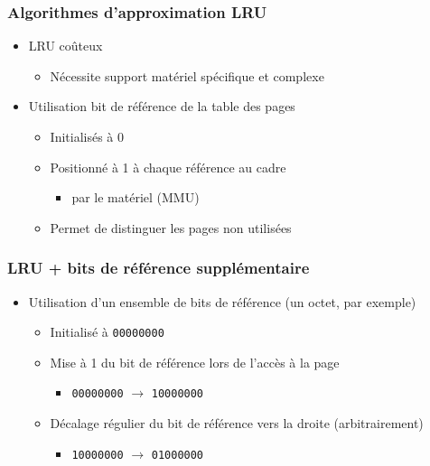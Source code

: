 \begin{frame}
\frametitle{Algorithmes d'approximation LRU}
\begin{itemize}
\item LRU coûteux
\begin{itemize}
\item Nécessite support matériel spécifique et complexe
\end{itemize}
\item Utilisation bit de référence de la table des pages
\begin{itemize}
\item Initialisés à 0
\item Positionné à 1 à chaque référence au cadre
\begin{itemize}
\item par le matériel (MMU)
\end{itemize}
\item Permet de distinguer les pages non utilisées 
\end{itemize}
\end{itemize}
\end{frame}


\begin{frame}
\frametitle{LRU + bits de référence supplémentaire}
\begin{itemize}
\item Utilisation d'un ensemble de bits de référence (un octet, par exemple)
\begin{itemize}
\item Initialisé à \texttt{00000000}
\item Mise à 1 du bit de référence lors de l'accès à la page
\begin{itemize}
\item \texttt{00000000} $\rightarrow$ \texttt{10000000}
\end{itemize}
\item Décalage régulier du bit de référence vers la droite (arbitrairement)
\begin{itemize}
\item \texttt{10000000} $\rightarrow$ \texttt{01000000}
\end{itemize}
\end{itemize}
\end{itemize}

\end{frame}


